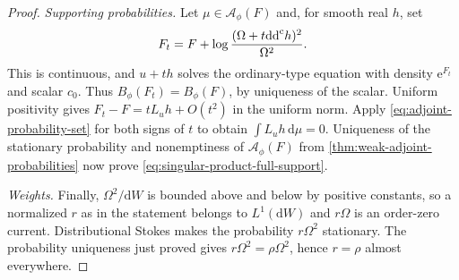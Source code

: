 \begin{proof}
\emph{Supporting probabilities.} Let $\mu\in\mathcal A_\phi(F)$ and, for smooth real $h$, set
\[
 F_t=F+\log\frac{(\Omega+t\mathrm{dd}^{\mathrm{c}} h)^2}{\Omega^2}.
\]
This is continuous, and $u+th$ solves the ordinary-type equation with density $\mathrm{e}^{F_t}$ and scalar $c_0$. Thus $B_\phi(F_t)=B_\phi(F)$, by uniqueness of the scalar. Uniform positivity gives $F_t-F=tL_uh+O(t^2)$ in the uniform norm. Apply \eqref{eq:adjoint-probability-set} for both signs of $t$ to obtain $\int L_uh\,\mathrm{d}\mu=0$. Uniqueness of the stationary probability and nonemptiness of $\mathcal A_\phi(F)$ from \cref{thm:weak-adjoint-probabilities} now prove \eqref{eq:singular-product-full-support}.

\emph{Weights.} Finally, $\Omega^2/\mathrm{d}W$ is bounded above and below by positive constants, so a normalized $r$ as in the statement belongs to $L^1(\mathrm{d}W)$ and $r\Omega$ is an order-zero current. Distributional Stokes makes the probability $r\Omega^2$ stationary. The probability uniqueness just proved gives $r\Omega^2=\rho\Omega^2$, hence $r=\rho$ almost everywhere.
\end{proof}

